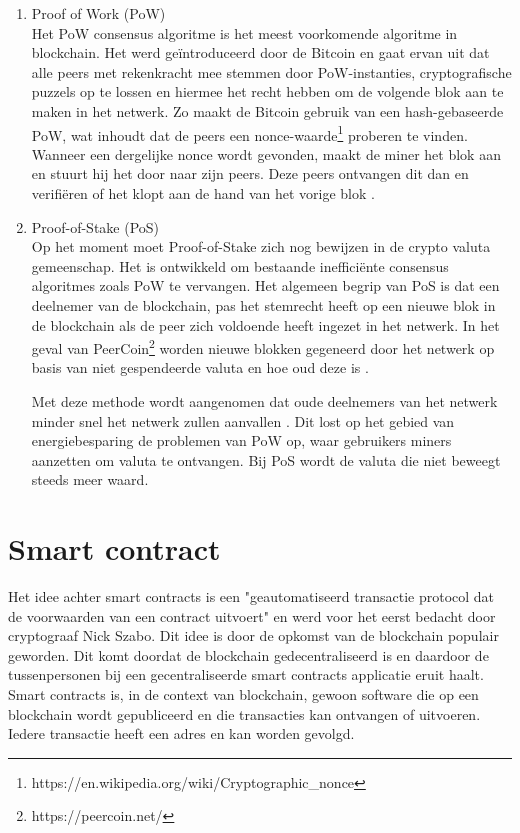 \begin{enumerate}
	\item Proof of Work (PoW)\\
	Het PoW consensus algoritme is het meest voorkomende algoritme in blockchain. Het werd geïntroduceerd door de Bitcoin en gaat ervan uit dat alle peers met rekenkracht mee stemmen door PoW-instanties, cryptografische puzzels op te lossen en hiermee het recht hebben om de volgende blok aan te maken in het netwerk. Zo maakt de Bitcoin gebruik van een hash-gebaseerde PoW, wat inhoudt dat de peers een nonce-waarde\footnote{https://en.wikipedia.org/wiki/Cryptographic\_nonce} proberen te vinden. Wanneer een dergelijke nonce wordt gevonden, maakt de miner het blok aan en stuurt hij het door naar zijn peers. Deze peers ontvangen dit dan en verifiëren of het klopt aan de hand van het vorige blok  \cite{securityPOW}.
	\item Proof-of-Stake (PoS)\\
Op het moment moet Proof-of-Stake zich nog bewijzen in de crypto valuta gemeenschap. Het is ontwikkeld om bestaande inefficiënte consensus algoritmes zoals PoW te vervangen. Het algemeen begrip van PoS is dat een deelnemer van de blockchain, pas het stemrecht heeft op een nieuwe blok in de blockchain als de peer zich voldoende heeft ingezet in het netwerk. In het geval van PeerCoin\footnote{https://peercoin.net/} worden nieuwe blokken gegeneerd door het netwerk op basis van niet gespendeerde valuta en hoe oud deze is \cite{posProtocol}.\par

Met deze methode wordt aangenomen dat oude deelnemers van het netwerk minder snel het netwerk zullen aanvallen \cite{blockchainIssuesAndChallenges}. Dit lost op het gebied van energiebesparing de problemen van PoW op, waar gebruikers miners aanzetten om valuta te ontvangen. Bij PoS wordt de valuta die niet beweegt steeds meer waard.
\end{enumerate}
\newpage

\section{Smart contract}
Het idee achter smart contracts is een "geautomatiseerd transactie protocol dat de voorwaarden van een contract uitvoert" \cite{smartContracts} en werd voor het eerst bedacht door cryptograaf Nick Szabo. Dit idee is door de opkomst van de blockchain populair geworden. Dit komt doordat de blockchain gedecentraliseerd is en daardoor de tussenpersonen bij een gecentraliseerde smart contracts applicatie eruit haalt. Smart contracts is, in de context van blockchain, gewoon software die op een blockchain wordt gepubliceerd en die transacties kan ontvangen of uitvoeren. Iedere transactie heeft een adres en kan worden gevolgd.\par